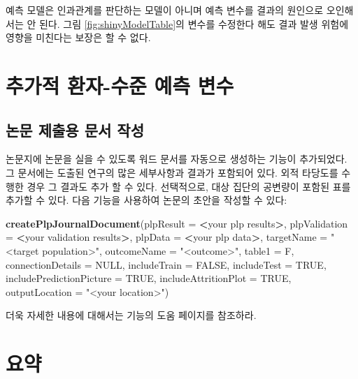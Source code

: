 \documentclass[10.5pt]{book}
\newenvironment{Shaded}{\begin{snugshade}}{\end{snugshade}}
\newcommand{\KeywordTok}[1]{\textcolor[rgb]{0.13,0.29,0.53}{\textbf{#1}}}
\newcommand{\DataTypeTok}[1]{\textcolor[rgb]{0.13,0.29,0.53}{#1}}
\newcommand{\StringTok}[1]{\textcolor[rgb]{0.31,0.60,0.02}{#1}}
\newcommand{\OtherTok}[1]{\textcolor[rgb]{0.56,0.35,0.01}{#1}}
\newcommand{\OperatorTok}[1]{\textcolor[rgb]{0.81,0.36,0.00}{\textbf{#1}}}
\newcommand{\NormalTok}[1]{#1}
\theoremstyle{definition}
\theoremstyle{definition}
\theoremstyle{definition}
\theoremstyle{remark}
\let\BeginKnitrBlock\begin \let\EndKnitrBlock\end
\begin{document}
\BeginKnitrBlock{rmdimportant}
예측 모델은 인과관계를 판단하는 모델이 아니며 예측 변수를 결과의
원인으로 오인해서는 안 된다. 그림 \ref{fig:shinyModelTable}의 변수를
수정한다 해도 결과 발생 위험에 영향을 미친다는 보장은 할 수 없다.
\EndKnitrBlock{rmdimportant}

\section{추가적 환자-수준 예측 변수}\label{----}

\subsection{논문 제출용 문서 작성}\label{---}

논문지에 논문을 실을 수 있도록 워드 문서를 자동으로 생성하는 기능이
추가되었다. 그 문서에는 도출된 연구의 많은 세부사항과 결과가 포함되어
있다. 외적 타당도를 수행한 경우 그 결과도 추가 할 수 있다. 선택적으로,
대상 집단의 공변량이 포함된 표를 추가할 수 있다. 다음 기능을 사용하여
논문의 초안을 작성할 수 있다:

\begin{Shaded}
\begin{Highlighting}[]
 \KeywordTok{createPlpJournalDocument}\NormalTok{(}\DataTypeTok{plpResult =} \OperatorTok{<}\NormalTok{your plp results}\OperatorTok{>}\NormalTok{,}
             \DataTypeTok{plpValidation =} \OperatorTok{<}\NormalTok{your validation results}\OperatorTok{>}\NormalTok{,}
             \DataTypeTok{plpData =} \OperatorTok{<}\NormalTok{your plp data}\OperatorTok{>}\NormalTok{,}
             \DataTypeTok{targetName =} \StringTok{"<target population>"}\NormalTok{,}
             \DataTypeTok{outcomeName =} \StringTok{"<outcome>"}\NormalTok{,}
             \DataTypeTok{table1 =}\NormalTok{ F,}
             \DataTypeTok{connectionDetails =} \OtherTok{NULL}\NormalTok{,}
             \DataTypeTok{includeTrain =} \OtherTok{FALSE}\NormalTok{,}
             \DataTypeTok{includeTest =} \OtherTok{TRUE}\NormalTok{,}
             \DataTypeTok{includePredictionPicture =} \OtherTok{TRUE}\NormalTok{,}
             \DataTypeTok{includeAttritionPlot =} \OtherTok{TRUE}\NormalTok{,}
             \DataTypeTok{outputLocation =} \StringTok{"<your location>"}\NormalTok{)}
\end{Highlighting}
\end{Shaded}

더욱 자세한 내용에 대해서는 기능의 도움 페이지를 참조하라.

\section{요약}\label{-11}
\end{document}
